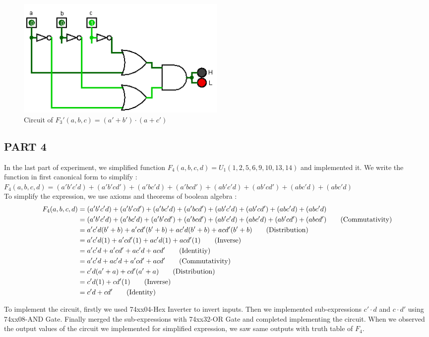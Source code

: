 \documentclass[pdftex,12pt,a4paper]{article}
\begin{document}
\begin{figure}[ht]
	\centering
	\includegraphics[width=0.5\textwidth]{2_3.png}	
	\caption{Circuit of $F_3'(a,b,c) = (a' + b') \cdot (a + c')$}
	\label{fig1}
\end{figure}

\subsection{PART 4}
In the last part of experiment, we simplified function $F_4(a,b,c,d) = U_1(1,2,5,6,9,10,13,14)$ and implemented it. We write the function in first canonical form to simplify :\\

$F_{4}(a,b,c,d) = (a'b'c'd) + (a'b'cd') + (a'bc'd) + (a'bcd') + (ab'c'd) + (ab'cd') + (abc'd) + (abc'd)$\\

To simplify the expression, we use axioms and theorems of boolean algebra :
\begin{align}
F_{4}(a,b,c,d) &= (a'b'c'd) + (a'b'cd') + (a'bc'd) + (a'bcd') + (ab'c'd) + (ab'cd') + (abc'd) + (abc'd) \notag\\ 
&= (a'b'c'd) + (a'bc'd) + (a'b'cd') + (a'bcd') + (ab'c'd) + (abc'd) + (ab'cd') + (abcd') \tag{Commutativity}\\
&= a'c'd(b' + b) + a'cd'(b'+b) + ac'd(b' + b) + acd'(b'+b) \tag{Distribution} \\
&= a'c'd(1) + a'cd'(1) + ac'd(1) + acd'(1) \tag{Inverse} \\
&= a'c'd + a'cd'+ ac'd+ acd' \tag{Identitiy} \\
&= a'c'd + ac'd + a'cd' + acd' \tag{Commutativity} \\
&= c'd(a' + a) + cd'(a' + a) \tag{Distribution} \\
&= c'd(1) + cd'(1) \tag{Inverse} \\
&= c'd + cd' \tag{Identity}
\end{align}

To implement the circuit, firstly we used 74xx04-Hex Inverter to invert inputs. Then we implemented sub-expressions $c' \cdot d$ and $c \cdot d'$ using 74xx08-AND Gate. Finally merged the sub-expressions with 74xx32-OR Gate and completed implementing the circuit. When we observed the output values of the circuit we implemented for simplified expression, we saw same outputs with truth table of $F_4$.
\end{document}
